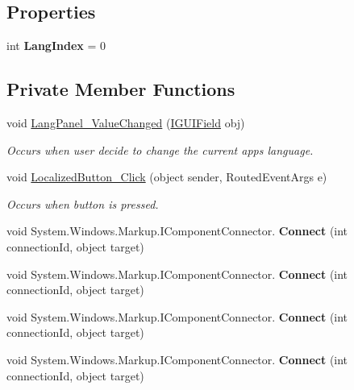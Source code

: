 \subsection*{Properties}
\begin{DoxyCompactItemize}
\item 
\mbox{\label{class_localization_sample_1_1_main_window_aa5ea8a01e892975c5150f7836224fc77}} 
int {\bfseries Lang\+Index} = 0
\end{DoxyCompactItemize}
\subsection*{Private Member Functions}
\begin{DoxyCompactItemize}
\item 
void \mbox{\hyperlink{class_localization_sample_1_1_main_window_a2efc399a8174f2f56a215628948e6747}{Lang\+Panel\+\_\+\+Value\+Changed}} (\mbox{\hyperlink{interface_wpf_handler_1_1_u_i_1_1_auto_layout_1_1_i_g_u_i_field}{I\+G\+U\+I\+Field}} obj)
\begin{DoxyCompactList}\small\item\em Occurs when user decide to change the current app\textquotesingle{}s language. \end{DoxyCompactList}\item 
void \mbox{\hyperlink{class_localization_sample_1_1_main_window_a82c42a7ea67057c4bb3b2cce133ef05c}{Localized\+Button\+\_\+\+Click}} (object sender, Routed\+Event\+Args e)
\begin{DoxyCompactList}\small\item\em Occurs when button is pressed. \end{DoxyCompactList}\item 
\mbox{\label{class_localization_sample_1_1_main_window_a08012171ec433692f33c60e61cb21c25}} 
void System.\+Windows.\+Markup.\+I\+Component\+Connector. {\bfseries Connect} (int connection\+Id, object target)
\item 
\mbox{\label{class_localization_sample_1_1_main_window_a08012171ec433692f33c60e61cb21c25}} 
void System.\+Windows.\+Markup.\+I\+Component\+Connector. {\bfseries Connect} (int connection\+Id, object target)
\item 
\mbox{\label{class_localization_sample_1_1_main_window_a08012171ec433692f33c60e61cb21c25}} 
void System.\+Windows.\+Markup.\+I\+Component\+Connector. {\bfseries Connect} (int connection\+Id, object target)
\item 
\mbox{\label{class_localization_sample_1_1_main_window_a08012171ec433692f33c60e61cb21c25}} 
void System.\+Windows.\+Markup.\+I\+Component\+Connector. {\bfseries Connect} (int connection\+Id, object target)
\end{DoxyCompactItemize}
